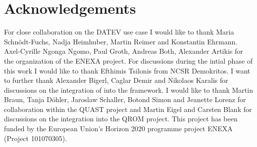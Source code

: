 \chapter{Acknowledgements}

For close collaboration on the DATEV use case I would like to thank Maria Schnödt-Fuchs, Nadja Heimhuber, Martin Reimer and Konstantin Ehrmann.
Axel-Cyrille Ngonga Ngomo, Paul Groth, Andreas Both, Alexander Artikis for the organization of the ENEXA project.
For discussions during the intial phase of this work I would like to thank Efthimis Tsilonis from NCSR Demokritos.
I want to further thank Alexander Bigerl, Caglar Demir and Nikolaos Karalis for discussions on the integration of  into the \tnreason framework.
I would like to thank Martin Braun, Tanja Döhler, Jaroslaw Schaller, Botond Simon and Jeanette Lorenz for collaboration within the QUAST project and
Martin Eigel and Carsten Blank for discussions on the integration into the QROM project.
This project has been funded by the European Union's Horizon 2020 programme project ENEXA (Project 101070305).